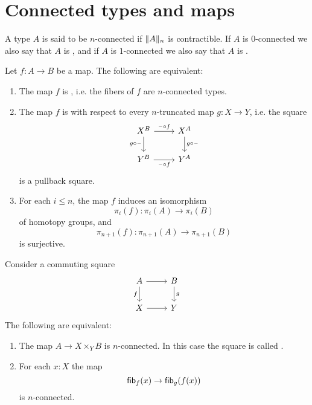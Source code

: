 
\section{Connected types and maps}

\begin{defn}
A type $A$ is said to be $n$-connected if $\trunc{n}{A}$ is contractible.
If $A$ is $0$-connected we also say that $A$ is ,
and if $A$ is $1$-connected we also say that $A$ is .
\end{defn}

\begin{thm}
Let $f:A\to B$ be a map. The following are equivalent:
\begin{enumerate}
\item The map $f$ is , i.e. the fibers of $f$ are $n$-connected types.
\item The map $f$ is  with respect to every $n$-truncated map $g:X\to Y$, i.e. the square
\begin{equation*}
\begin{tikzcd}
X^B \arrow[r,"\blank\circ f"] \arrow[d,swap,"g\circ \blank"] & X^A \arrow[d,"g\circ\blank"] \\
Y^B \arrow[r,swap,"\blank\circ f"] & Y^A
\end{tikzcd}
\end{equation*}
is a pullback square.
\item For each $i\leq n$, the map $f$ induces an isomorphism
\begin{equation*}
\pi_i(f):\pi_i(A)\to\pi_i(B)
\end{equation*}
of homotopy groups, and 
\begin{equation*}
\pi_{n+1}(f):\pi_{n+1}(A)\to\pi_{n+1}(B)
\end{equation*}
is surjective.
\end{enumerate}
\end{thm}

\begin{thm}
Consider a commuting square
\begin{equation*}
\begin{tikzcd}
A \arrow[d,swap,"f"] \arrow[r] & B \arrow[d,"g"] \\
X \arrow[r] & Y
\end{tikzcd}
\end{equation*}
The following are equivalent:
\begin{enumerate}
\item The map $A\to X\times_Y B$ is $n$-connected. In this case the square is called .
\item For each $x:X$ the map
\begin{equation*}
\fib{f}{x}\to \fib{g}{f(x)}
\end{equation*}
is $n$-connected.
\end{enumerate}
\end{thm}

